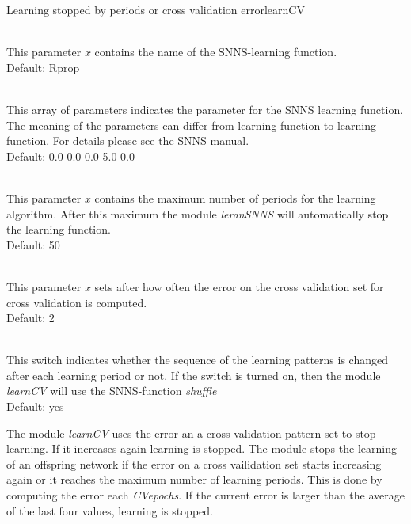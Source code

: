 \begin{moduledoc}{Learning stopped by periods or cross validation error}{learnCV}
  \item[\KeyWord{learnfct} \optParam{ x } ]~\\
    This parameter $x$  contains the name of the SNNS-learning function.\\
    Default: Rprop
  \item[\KeyWord{learnparam} \optParam{ x } ]~\\
    This array of parameters indicates the parameter for the SNNS learning function.
    The meaning of the parameters can differ from learning function to learning function.
    For details please see the SNNS manual.\\
    Default: 0.0 0.0 0.0 5.0 0.0
  \item[\KeyWord{maxepochs} \optParam{ x } ]~\\
    This parameter $x$ contains the maximum number of periods for the learning 
    algorithm. After this maximum the module {\it leranSNNS} will automatically stop the 
    learning function.\\
    Default: 50
  \item[\KeyWord{CVepochs} \optParam{ x } ]~\\
    This parameter $x$ sets after how often  the error on the cross validation set for
cross validation is computed.\\
    Default: 2
  \item[\KeyWord{shuffle} \optParam{ x } ]~\\
    This switch indicates whether the sequence of the learning patterns is changed after
    each learning period or not.
    If the switch is turned on, then the module {\it learnCV} will use the
    SNNS-function {\it shuffle}\\
    Default: yes
\end{moduledoc}


The module {\it learnCV} uses the error an a cross validation pattern set to stop learning.
If it increases again learning is stopped. 
The module stops the learning of an offspring network if the error on a cross vailidation set starts
increasing again  or it reaches the maximum number of learning periods. This is done
by computing the error each {\it CVepochs}. If the current error is larger than the average
of the last four values, learning is stopped.



